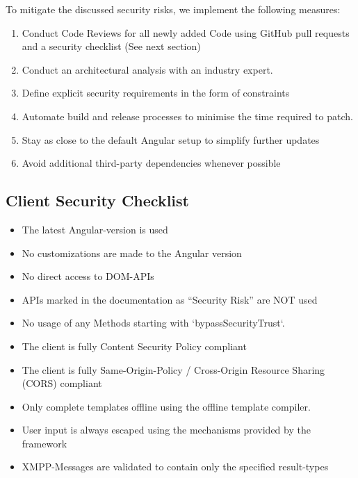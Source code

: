 To mitigate the discussed security risks, we implement the following measures:

\begin{enumerate}
    \item Conduct Code Reviews for all newly added Code using GitHub pull requests and a security checklist (See next section)
    \item Conduct an architectural analysis with an industry expert. %
    \item Define explicit security requirements in the form of constraints
    \item Automate build and release processes to minimise the time required to patch.
    \item Stay as close to the default Angular setup to simplify further updates
    \item Avoid additional third-party dependencies whenever possible
\end{enumerate}

\subsection{Client Security Checklist}
\begin{itemize}
    \item The latest Angular-version is used
    \item No customizations are made to the Angular version
    \item No direct access to DOM-APIs
    \item APIs marked in the documentation as ``Security Risk'' are NOT used
    \item No usage of any Methods starting with `bypassSecurityTrust`.
    \item The client is fully Content Security Policy compliant
    \item The client is fully Same-Origin-Policy / Cross-Origin Resource Sharing (CORS) compliant
    \item Only complete templates offline using the offline template compiler.
    \item User input is always escaped using the mechanisms provided by the framework
    \item XMPP-Messages are validated to contain only the specified result-types
\end{itemize}

